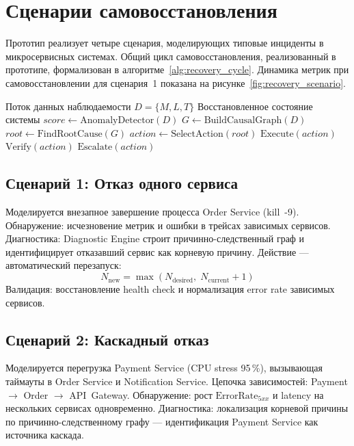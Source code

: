 \section{Сценарии самовосстановления}

Прототип реализует четыре сценария, моделирующих типовые инциденты в микросервисных системах. Общий цикл самовосстановления, реализованный в прототипе, формализован в алгоритме~\ref{alg:recovery_cycle}. Динамика метрик при самовосстановлении для сценария~1 показана на рисунке~\ref{fig:recovery_scenario}.

\begin{algorithm}[H]
\caption{Общий цикл самовосстановления}
\label{alg:recovery_cycle}
\begin{algorithmic}[1]
\REQUIRE Поток данных наблюдаемости $D = \{M, L, T\}$
\ENSURE Восстановленное состояние системы
\STATE $score \gets \text{AnomalyDetector}(D)$
  \STATE $G \gets \text{BuildCausalGraph}(D)$
  \STATE $root \gets \text{FindRootCause}(G)$
  \STATE $action \gets \text{SelectAction}(root)$
    \STATE $\text{Execute}(action)$
    \STATE $\text{Verify}(action)$
  \ELSE
    \STATE $\text{Escalate}(action)$
  \ENDIF
\ENDIF
\end{algorithmic}
\end{algorithm}

\subsection{Сценарий 1: Отказ одного сервиса}

Моделируется внезапное завершение процесса Order Service (kill~-9). Обнаружение: исчезновение метрик и ошибки в трейсах зависимых сервисов. Диагностика: Diagnostic Engine строит причинно-следственный граф и идентифицирует отказавший сервис как корневую причину. Действие --- автоматический перезапуск:
\begin{equation}
N_{\text{new}} = \max\!\left(N_{\text{desired}},\; N_{\text{current}} + 1\right)
\label{eq:scaling_action}
\end{equation}
Валидация: восстановление health check и нормализация error rate зависимых сервисов.

\subsection{Сценарий 2: Каскадный отказ}

Моделируется перегрузка Payment Service (CPU stress 95\,\%), вызывающая таймауты в Order Service и Notification Service. Цепочка зависимостей: Payment $\to$ Order $\to$ API~Gateway. Обнаружение: рост $\text{ErrorRate}_{5xx}$ и latency на нескольких сервисах одновременно. Диагностика: локализация корневой причины по причинно-следственному графу --- идентификация Payment Service как источника каскада.

